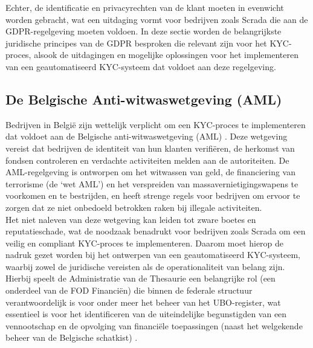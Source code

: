 Echter, de identificatie en privacyrechten van de klant moeten in evenwicht worden gebracht, wat een uitdaging vormt voor bedrijven zoals Scrada die aan de GDPR-regelgeving moeten voldoen.
In deze sectie worden de belangrijkste juridische principes van de GDPR besproken die relevant zijn voor het KYC-proces, 
alsook de uitdagingen en mogelijke oplossingen voor het implementeren van een geautomatiseerd KYC-systeem dat voldoet aan deze regelgeving.

\subsection{De Belgische Anti-witwaswetgeving (AML)}
Bedrijven in België zijn wettelijk verplicht om een KYC-proces te implementeren dat voldoet aan de Belgische 
anti-witwaswetgeving (AML) \autocite{FODFinancien2026}.
Deze wetgeving vereist dat bedrijven de identiteit van hun klanten verifiëren, 
de herkomst van fondsen controleren en verdachte activiteiten melden aan de autoriteiten. 
De AML-regelgeving is ontworpen om het witwassen van geld, de financiering van terrorisme (de ‘wet AML’) en het verspreiden van massavernietigingswapens
te voorkomen en te bestrijden, en heeft strenge regels voor bedrijven om ervoor te zorgen dat ze niet onbedoeld betrokken raken bij illegale activiteiten. \\
Het niet naleven van deze wetgeving kan leiden tot zware boetes en reputatieschade, wat de noodzaak benadrukt voor bedrijven zoals Scrada om een veilig en compliant KYC-proces te implementeren.
Daarom moet hierop de nadruk gezet worden bij het ontwerpen van een geautomatiseerd KYC-systeem, waarbij zowel de juridische vereisten als de operationaliteit van belang zijn.
Hierbij speelt de Administratie van de Thesaurie een belangrijke rol (een onderdeel van de FOD Financiën) die 
binnen de federale structuur verantwoordelijk is voor onder meer het beheer van het UBO-register, wat essentieel is voor het identificeren van de uiteindelijke begunstigden 
van een vennootschap en de opvolging van financiële toepassingen (naast het welgekende beheer van de Belgische schatkist) \autocite{VlaamseOverheid2026}.

